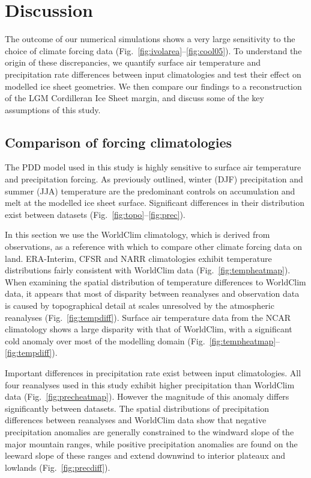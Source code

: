 \section{Discussion}
\label{sec:discussion}

The outcome of our numerical simulations shows a very large sensitivity to the choice of climate forcing data (Fig.~\ref{fig:ivolarea}--\ref{fig:cool05}). To understand the origin of these discrepancies, we quantify surface air temperature and precipitation rate differences between input climatologies and test their effect on modelled ice sheet geometries. We then compare our findings to a reconstruction of the LGM Cordilleran Ice Sheet margin, and discuss some of the key assumptions of this study.

\subsection{Comparison of forcing climatologies}

The PDD model used in this study is highly sensitive to surface air temperature and precipitation forcing. As previously outlined, winter (DJF) precipitation and summer (JJA) temperature are the predominant controls on accumulation and melt at the modelled ice sheet surface. Significant differences in their distribution exist between datasets (Fig.~\ref{fig:topo}--\ref{fig:prec}).

In this section we use the WorldClim climatology, which is derived from observations, as a reference with which to compare other climate forcing data on land. ERA-Interim, CFSR and NARR climatologies exhibit temperature distributions fairly consistent with WorldClim data (Fig.~\ref{fig:tempheatmap}). When examining the spatial distribution of temperature differences to WorldClim data, it appears that most of disparity between reanalyses and observation data is caused by topographical detail at scales unresolved by the atmospheric reanalyses (Fig.~\ref{fig:tempdiff}). Surface air temperature data from the NCAR climatology shows a large disparity with that of WorldClim, with a significant cold anomaly over most of the modelling domain (Fig.~\ref{fig:tempheatmap}--\ref{fig:tempdiff}).

Important differences in precipitation rate exist between input climatologies. All four reanalyses used in this study exhibit higher precipitation than WorldClim data (Fig.~\ref{fig:precheatmap}). However the magnitude of this anomaly differs significantly between datasets. The spatial distributions of precipitation differences between reanalyses and WorldClim data show that negative precipitation anomalies are generally constrained to the windward slope of the major mountain ranges, while positive precipitation anomalies are found on the leeward slope of these ranges and extend downwind to interior plateaux and lowlands (Fig.~\ref{fig:precdiff}).

